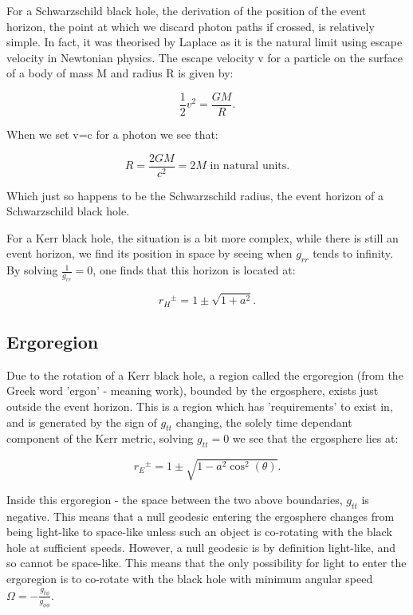 \documentclass[oneside,openright,frontopenright, singlespacing]{dmathesis}
\begin{document}
	For a Schwarzschild black hole, the derivation of the position of the event horizon, the point at which we discard photon paths if crossed, is relatively simple. In fact, it was theorised by Laplace as it is the natural limit using escape velocity in Newtonian physics. The escape velocity v for a particle on the surface of a body of mass M and radius R is given by:

	\[\frac{1}{2}v^2 = \frac{GM}{R}.\]

	When we set v=c for a photon we see that:

	\[R = \frac{2GM}{c^2} = 2M \mbox{ in natural units}.\]

	Which just so happens to be the Schwarzschild radius, the event horizon of a Schwarzschild black hole.

\vspace{1em}
	For a Kerr black hole, the situation is a bit more complex, while there is still an event horizon, we find its position in space by seeing when $g_{rr}$ tends to infinity. By solving $\frac{1}{g_{rr}}=0$, one finds that this horizon is located at:

	\[{r_{H}}^{\pm} = 1\pm\sqrt{1+a^2}.\]

\subsection{Ergoregion}\label{subsec:Subsection4.3.2}

	Due to the rotation of a Kerr black hole, a region called the ergoregion (from the Greek word 'ergon' - meaning work), bounded by the ergosphere, exists just outside the event horizon. This is a region which has 'requirements' to exist in, and is generated by the sign of $g_{tt}$ changing, the solely time dependant component of the Kerr metric, solving $g_{tt}=0$ we see that the ergosphere lies at:

	\[{r_{E}}^{\pm} = 1\pm\sqrt{1-a^2\cos^2(\theta)}.\]

	Inside this ergoregion - the space between the two above boundaries, $g_{tt}$ is negative. This means that a null geodesic entering the ergosphere changes from being light-like to space-like unless such an object is co-rotating with the black hole at sufficient speeds. However, a null geodesic is by definition light-like, and so cannot be space-like. This means that the only possibility for light to enter the ergoregion is to co-rotate with the black hole with minimum angular speed $\Omega=-\frac{g_{t\phi}}{g_{\phi\phi}}$.
\end{document}
